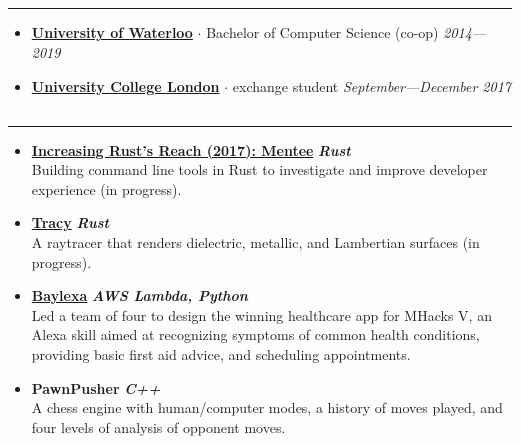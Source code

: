 \documentclass[5pt,letterpaper]{article}
\newcommand{\dt}{$\cdot$ }
\begin{document}
\subsection*{}
\hrule
\vspace{1.0em}
\begin{itemize}[leftmargin=1em, noitemsep]
  \item[]
    {\href{http://www.uwaterloo.ca}{\textbf{University of Waterloo}}} \dt Bachelor of Computer Science (co-op) \hfill \emph{2014---2019}
  \item[]
    {\href{https://www.ucl.ac.uk/}{\textbf{University College London}}} \dt exchange student
    \hfill \emph{September---December 2017}

\end{itemize}

\subsection*{}
\hrule
\vspace{1.0em}
\begin{itemize}[leftmargin=1em, noitemsep]
  \item []
    \textbf{\href{https://blog.rust-lang.org/2017/06/27/Increasing-Rusts-Reach.html}{Increasing
    Rust's Reach (2017): Mentee}} \hfill \textbf{\emph{Rust}}
    \\
    Building command line tools in Rust to investigate and improve developer
    experience (in progress).
  \item[]
    \textbf{\href{https://github.com/arshiamufti/tracy}{Tracy}} \hfill \textbf{\emph{Rust}}
    \\
    A raytracer that renders dielectric, metallic, and Lambertian surfaces (in progress).
  \item[]
    {\href{http://devpost.com/software/baylexa-fv149r}{\textbf{Baylexa}}}
    \hfill \textbf{\emph{AWS Lambda, Python}}
    \\
    Led a team of four to design the winning healthcare app for MHacks V, an
    Alexa skill aimed at recognizing symptoms of common health conditions,
    providing basic first aid advice, and scheduling appointments.
  \item[]
    \textbf{PawnPusher} \hfill \textbf{\emph{C++}}
    \\
    A chess engine with human/computer modes, a history of moves played, and
    four levels of analysis of opponent moves.
\end{itemize}
\end{document}
